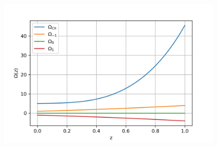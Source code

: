 \documentclass[a4paper, 11pt]{FSKH_623_Report}
\numberwithin{equation}{section}
\begin{document}
\begin{figure}[H]
\centering
\includegraphics[scale=1]{Figures/ch_Om.jpg}
\caption{}
\end{figure}
\end{document}
